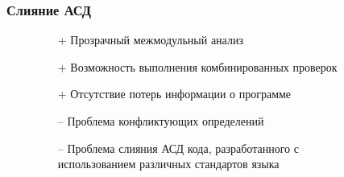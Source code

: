 \documentclass[hyperref={pdfpagelabels=false},10pt,gray]{beamer}
\begin{document}
\begin{frame}
\frametitle{Слияние АСД}
\begin{figure}[h]
  \begin{minipage}[h]{0.49\linewidth}
\begin{itemize}
 \item[+] Прозрачный межмодульный анализ
 \item[+] Возможность выполнения комбинированных проверок
 \item[+] Отсутствие потерь информации о программе
\end{itemize}
  \end{minipage}
  \hfill
  \begin{minipage}[h]{0.49\linewidth}
\begin{itemize}
 \item[--] Проблема конфликтующих определений
 \item[--] Проблема слияния АСД кода, разработанного с использованием различных стандартов языка
\end{itemize}
  \end{minipage}
\end{figure}
\end{frame}

\end{document}
